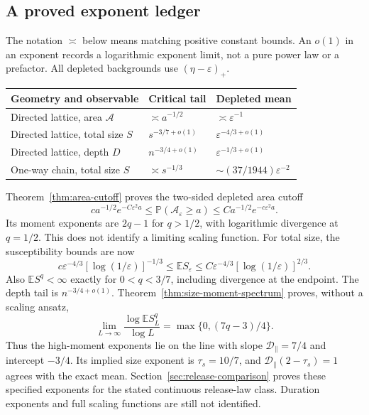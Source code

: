 \documentclass[11pt]{article}
\numberwithin{equation}{section}
\theoremstyle{definition}
\newcommand{\E}{\mathbb E}
\newcommand{\Prob}{\mathbb P}
\begin{document}
\subsection{A proved exponent ledger}
The notation $\asymp$ below means matching positive constant bounds. An $o(1)$ in an exponent records a logarithmic exponent limit, not a pure power law or a prefactor. All depleted backgrounds use $(\eta-\varepsilon)_+$.
\begin{center}
\begin{tabular}{@{}>{\raggedright\arraybackslash}p{}>{\raggedright\arraybackslash}p{}>{\raggedright\arraybackslash}p{}@{}}
\toprule
Geometry and observable & Critical tail & Depleted mean\\\midrule
Directed lattice, area $\mathcal A$ & $\asymp a^{-1/2}$ & $\asymp\varepsilon^{-1}$\\
Directed lattice, total size $S$ & $s^{-3/7+o(1)}$ & $\varepsilon^{-4/3+o(1)}$\\
Directed lattice, depth $D$ & $n^{-3/4+o(1)}$ & $\varepsilon^{-1/3+o(1)}$\\
One-way chain, total size $S$ & $\asymp s^{-1/3}$ & $\sim(37/1944)\varepsilon^{-2}$\\
\bottomrule
\end{tabular}
\end{center}
Theorem~\ref{thm:area-cutoff} proves the two-sided depleted area cutoff
\[
 c a^{-1/2}e^{-C\varepsilon^2a}\le\Prob(\mathcal A_\varepsilon\ge a)
 \le C a^{-1/2}e^{-c\varepsilon^2a}.
\]
Its moment exponents are $2q-1$ for $q>1/2$, with logarithmic divergence at $q=1/2$. This does not identify a limiting scaling function. For total size, the susceptibility bounds are now
\[
 c\varepsilon^{-4/3}[\log(1/\varepsilon)]^{-1/3}
 \le\E S_\varepsilon\le C\varepsilon^{-4/3}[\log(1/\varepsilon)]^{2/3}.
\]
Also $\E S^q<\infty$ exactly for $0<q<3/7$, including divergence at the endpoint. The depth tail is $n^{-3/4+o(1)}$. Theorem~\ref{thm:size-moment-spectrum} proves, without a scaling ansatz,
\[
 \lim_{L\to\infty}\frac{\log\E S_L^q}{\log L}
 =\max\{0,(7q-3)/4\}.
\]
Thus the high-moment exponents lie on the line with slope $\mathcal D_\parallel=7/4$ and intercept $-3/4$. Its implied size exponent is $\tau_s=10/7$, and $\mathcal D_\parallel(2-\tau_s)=1$ agrees with the exact mean. Section~\ref{sec:release-comparison} proves these specified exponents for the stated continuous release-law class. Duration exponents and full scaling functions are still not identified.
\end{document}
